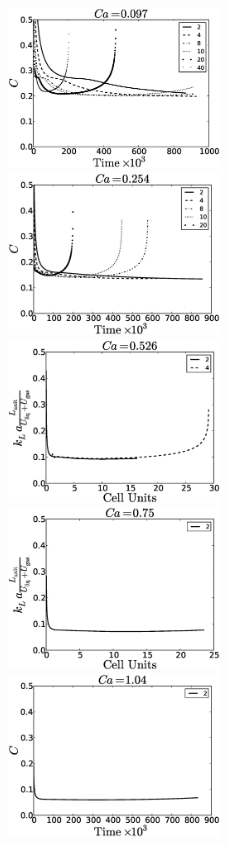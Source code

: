 \documentclass{article}
\begin{document}
\begin{figure}[htb!]
\includegraphics[width=0.5\textwidth]{Figures/aver_conc_scale_ca097.eps}
\includegraphics[width=0.5\textwidth]{Figures/aver_conc_scale_ca054.eps}\\
\includegraphics[width=0.5\textwidth]{Figures/aver_conc_scale_ca026.eps}
\includegraphics[width=0.5\textwidth]{Figures/aver_conc_scale_ca05.eps}\\
\includegraphics[width=0.5\textwidth]{Figures/aver_conc_scale_ca14.eps}

\end{figure}
\end{document}
